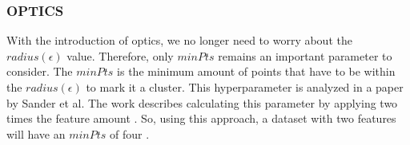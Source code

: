 \subsubsection{OPTICS} \label{theory:clustering-dbscan}
With the introduction of \gls{optics}, we no longer need to worry about the $radius(\epsilon)$ value.
Therefore, only $minPts$ remains an important parameter to consider. \newline
The $minPts$ is the minimum amount of points that have to be within the $radius(\epsilon)$ to mark it a cluster.
This hyperparameter is analyzed in a paper by Sander et al.
The work describes calculating this parameter by applying two times the feature amount \citep{sander_density-based_1998}.
So, using this approach, a dataset with two features will have an $minPts$ of four \citep{schubert_dbscan_2017}.

